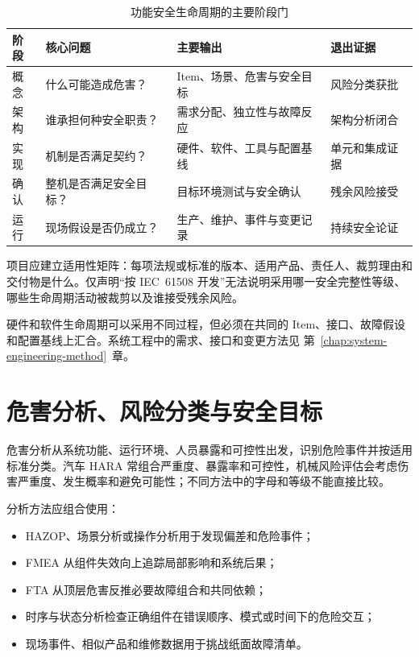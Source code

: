 \begin{table}[H]
  \centering
  \caption{功能安全生命周期的主要阶段门}
  \begin{tabular}{p{25mm}p{39mm}p{43mm}p{29mm}}
    \hline
    阶段 & 核心问题 & 主要输出 & 退出证据 \\
    \hline
    概念 & 什么可能造成危害？ & Item、场景、危害与安全目标 & 风险分类获批 \\
    架构 & 谁承担何种安全职责？ & 需求分配、独立性与故障反应 & 架构分析闭合 \\
    实现 & 机制是否满足契约？ & 硬件、软件、工具与配置基线 & 单元和集成证据 \\
    确认 & 整机是否满足安全目标？ & 目标环境测试与安全确认 & 残余风险接受 \\
    运行 & 现场假设是否仍成立？ & 生产、维护、事件与变更记录 & 持续安全论证 \\
    \hline
  \end{tabular}
\end{table}

项目应建立适用性矩阵：每项法规或标准的版本、适用产品、责任人、裁剪理由和交付物是什么。仅声明“按 IEC~61508 开发”无法说明采用哪一安全完整性等级、哪些生命周期活动被裁剪以及谁接受残余风险。

硬件和软件生命周期可以采用不同过程，但必须在共同的 Item、接口、故障假设和配置基线上汇合。系统工程中的需求、接口和变更方法见 \mbox{第~\ref{chap:system-engineering-method}~章}。

\section{危害分析、风险分类与安全目标}

危害分析从系统功能、运行环境、人员暴露和可控性出发，识别危险事件并按适用标准分类。汽车 HARA 常组合严重度、暴露率和可控性，机械风险评估会考虑伤害严重度、发生概率和避免可能性；不同方法中的字母和等级不能直接比较。

分析方法应组合使用：

\begin{itemize}
  \item HAZOP、场景分析或操作分析用于发现偏差和危险事件；
  \item FMEA 从组件失效向上追踪局部影响和系统后果；
  \item FTA 从顶层危害反推必要故障组合和共同依赖；
  \item 时序与状态分析检查正确组件在错误顺序、模式或时间下的危险交互；
  \item 现场事件、相似产品和维修数据用于挑战纸面故障清单。
\end{itemize}

